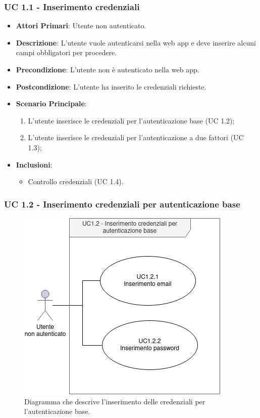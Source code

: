 		\subsubsection{UC 1.1 - Inserimento credenziali}

		\begin{itemize}
			\item \textbf{Attori Primari}: Utente non autenticato.
			\item \textbf{Descrizione}: L'utente vuole autenticarsi nella web app e deve inserire alcuni campi obbligatori per procedere.
			\item \textbf{Precondizione}: L'utente non è autenticato nella web app.
			\item \textbf{Postcondizione}: L'utente ha inserito le credenziali richieste.
			\item \textbf{Scenario Principale}:
			\begin{enumerate}
				\item L'utente inserisce le credenziali per l'autenticazione base (UC 1.2);
				\item L'utente inserisce le credenziali per l'autenticazione a due fattori (UC 1.3);
			\end{enumerate}
			\item \textbf{Inclusioni}:
				\begin{itemize}
					\item Controllo credenziali (UC 1.4).
				\end{itemize}
		\end{itemize}

		\subsubsection{UC 1.2 - Inserimento credenziali per autenticazione base}

		\begin{figure}[H]
			\centering
			\includegraphics[scale=0.675]{res/images/uc1.2}
			\caption{Diagramma che descrive l'inserimento delle credenziali per l'autenticazione base.}
		\end{figure}

